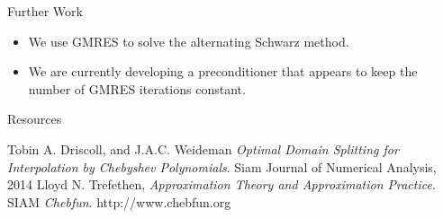 \documentclass{beamer}
\begin{document}
\begin{frame}{Further Work}
\begin{itemize}
\item We use GMRES to solve the alternating Schwarz method.
\item We are currently developing a preconditioner that appears to keep the number of GMRES iterations constant.	
\end{itemize}

\end{frame}

\begin{frame}{Resources}
\begin{thebibliography}{9}
Tobin A. Driscoll, and J.A.C. Weideman
\textit{Optimal Domain Splitting for Interpolation by Chebyshev Polynomials}. 
Siam Journal of Numerical Analysis, 2014
Lloyd N. Trefethen,
\textit{Approximation Theory and Approximation Practice}. 
SIAM
\textit{Chebfun}. 
http://www.chebfun.org
\end{thebibliography}
\end{frame}
\end{document}
